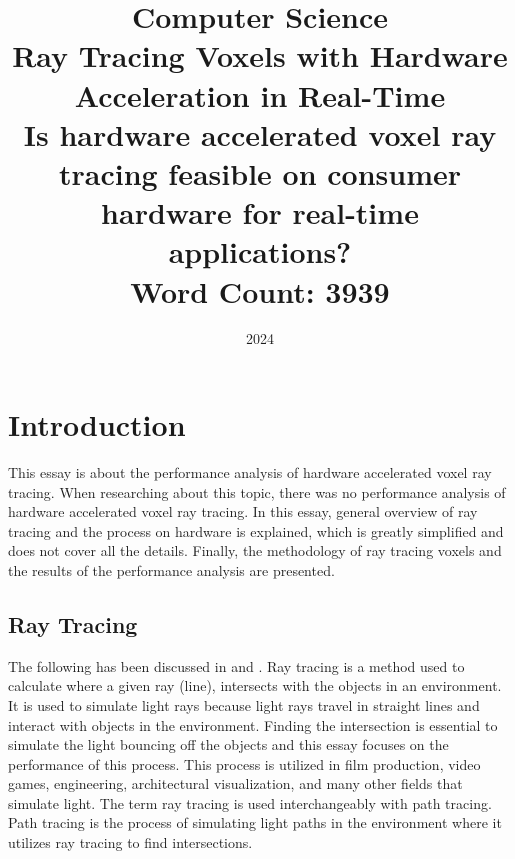 \documentclass[12pt]{article}
\title{
    Computer Science \\
    \vspace{1cm}
    Ray Tracing Voxels with Hardware Acceleration in Real-Time \\
    \vspace{1cm}
    \large Is hardware accelerated voxel ray tracing feasible on consumer hardware for real-time applications? \\
    \vspace{1cm}
    \large Word Count: 3939
    }
\author{}
\date{2024}
\begin{document}
\maketitle
\clearpage

\tableofcontents
\clearpage


\clearpage

\section{Introduction}

This essay is about the performance analysis of hardware accelerated voxel ray tracing.
When researching about this topic, there was no performance analysis of hardware accelerated voxel ray tracing.
In this essay, general overview of ray tracing and the process on hardware is explained,
which is greatly simplified and does not cover all the details. Finally, the methodology of
ray tracing voxels and the results of the performance analysis are presented.

\subsection{Ray Tracing}

The following has been discussed in \parencite{NVIDIA:Raytracing} and \parencite{NVIDIA:RTGems2}.
Ray tracing is a method used to calculate where a given ray (line), intersects
with the objects in an environment. It is used to simulate light rays because light rays
travel in straight lines and interact with objects in the environment.
Finding the intersection is essential to simulate the light bouncing off the objects and this essay
focuses on the performance of this process.
This process is utilized in film production, video games, engineering,
architectural visualization, and many other fields that simulate light.
The term ray tracing is used interchangeably with path tracing.
Path tracing is the process of simulating light paths in the environment where it utilizes ray tracing to find intersections.
\end{document}
